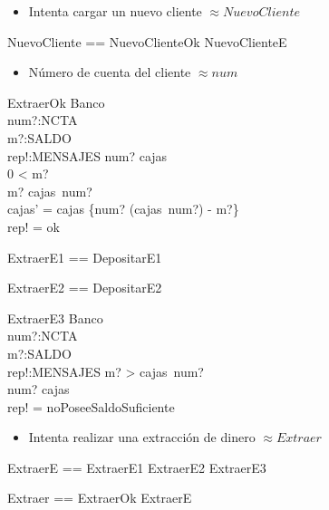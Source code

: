 \begin{itemize}
  \item Intenta cargar un nuevo cliente $\approx NuevoCliente$ \\
\end{itemize}

\begin{zed}
NuevoCliente == NuevoClienteOk \lor NuevoClienteE
\end{zed}

\begin{itemize}
  \item Número de cuenta del cliente $\approx num$ \\
\end{itemize}

\begin{schema}{ExtraerOk}
\Delta Banco \\
num?:NCTA \\
m?:SALDO \\
rep!:MENSAJES
\where
num? \in \dom cajas \\
0 < m? \\
m? \leq cajas~num? \\
cajas' = cajas \oplus \{num? \mapsto (cajas~num?) - m?\} \\
rep! = ok
\end{schema}

\begin{zed}
ExtraerE1 == DepositarE1 \also

ExtraerE2 == DepositarE2
\end{zed}

\begin{schema}{ExtraerE3}
\Xi Banco \\
num?:NCTA \\
m?:SALDO \\
rep!:MENSAJES
\where
m? > cajas~num? \\
num? \in \dom cajas \\
rep! = noPoseeSaldoSuficiente
\end{schema}

\begin{itemize}
  \item Intenta realizar una extracción de dinero $\approx Extraer$ \\
\end{itemize}

\begin{zed}
ExtraerE == ExtraerE1 \lor ExtraerE2 \lor ExtraerE3 \also

Extraer == ExtraerOk \lor ExtraerE
\end{zed}

